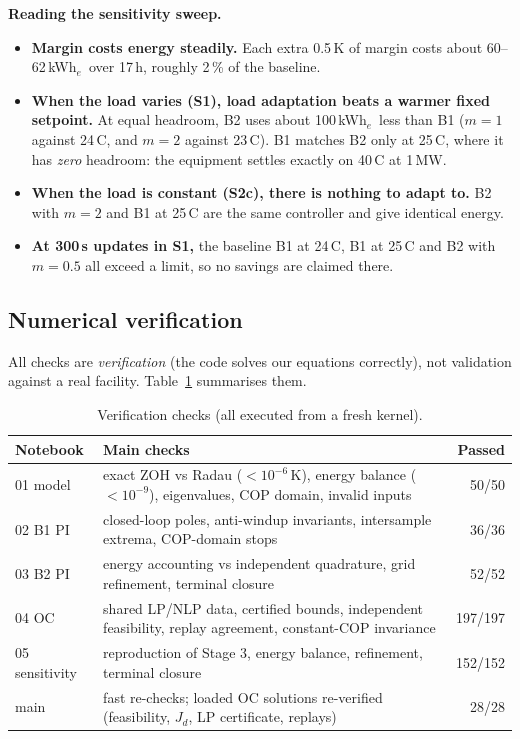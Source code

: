 \documentclass[12pt,a4paper]{report}
\theoremstyle{definition}
\newcommand{\kWhe}{kWh$_e$}
\begin{document}
\noindent\textbf{Reading the sensitivity sweep.}
\begin{itemize}
\item \textbf{Margin costs energy steadily.} Each extra 0.5\,K of margin costs about 60--62\,\kWhe\ over 17\,h, roughly 2\,\% of the baseline.
\item \textbf{When the load varies (S1), load adaptation beats a warmer fixed setpoint.} At equal headroom, B2 uses about 100\,\kWhe\ less than B1 ($m=1$ against 24\,\textdegree C, and $m=2$ against 23\,\textdegree C). B1 matches B2 only at 25\,\textdegree C, where it has \emph{zero} headroom: the equipment settles exactly on 40\,\textdegree C at 1\,MW.
\item \textbf{When the load is constant (S2c), there is nothing to adapt to.} B2 with $m=2$ and B1 at 25\,\textdegree C are the same controller and give identical energy.
\item \textbf{At 300\,s updates in S1,} the baseline B1 at 24\,\textdegree C, B1 at 25\,\textdegree C and B2 with $m=0.5$ all exceed a limit, so no savings are claimed there.
\end{itemize}

\subsection*{Numerical verification}
All checks are \emph{verification} (the code solves our equations correctly), not validation against a real facility. Table~\ref{tab:verif} summarises them.

\begin{table}[H]
\centering\small
\caption{Verification checks (all executed from a fresh kernel).}
\label{tab:verif}
\begin{tabularx}{\textwidth}{@{}lXr@{}}
\toprule
Notebook & Main checks & Passed\\
\midrule
01 model & exact ZOH vs Radau ($<10^{-6}$\,K), energy balance ($<10^{-9}$), eigenvalues, COP domain, invalid inputs & 50/50\\
02 B1 PI & closed-loop poles, anti-windup invariants, intersample extrema, COP-domain stops & 36/36\\
03 B2 PI & energy accounting vs independent quadrature, grid refinement, terminal closure & 52/52\\
04 OC & shared LP/NLP data, certified bounds, independent feasibility, replay agreement, constant-COP invariance & 197/197\\
05 sensitivity & reproduction of Stage 3, energy balance, refinement, terminal closure & 152/152\\
main & fast re-checks; loaded OC solutions re-verified (feasibility, $J_d$, LP certificate, replays) & 28/28\\
\bottomrule
\end{tabularx}
\end{table}
\end{document}
